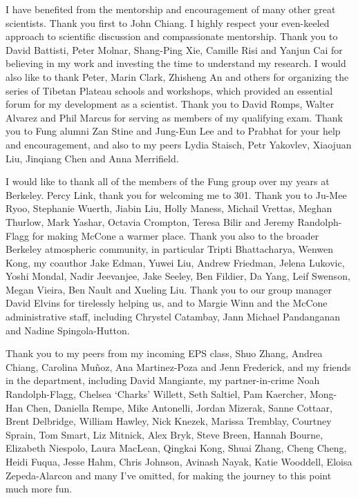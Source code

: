\documentclass{ucbthesis}
\begin{document}
\begin{frontmatter}
\begin{acknowledgements}
I have benefited from the mentorship and encouragement of many other great scientists. Thank you first to John Chiang. I highly respect your even-keeled approach to scientific discussion and compassionate mentorship. Thank you to David Battisti, Peter Molnar, Shang-Ping Xie, Camille Risi and Yanjun Cai for believing in my work and investing the time to understand my research. I would also like to thank Peter, Marin Clark, Zhisheng An and others for organizing the series of Tibetan Plateau schools and workshops, which provided an essential forum for my development as a scientist. Thank you to David Romps, Walter Alvarez and Phil Marcus for serving as members of my qualifying exam. Thank you to Fung alumni Zan Stine and Jung-Eun Lee and to Prabhat for your help and encouragement, and also to my peers Lydia Staisch, Petr Yakovlev, Xiaojuan Liu, Jinqiang Chen and Anna Merrifield.

I would like to thank all of the members of the Fung group over my years at Berkeley. Percy Link, thank you for welcoming me to 301. Thank you to Ju-Mee Ryoo, Stephanie Wuerth, Jiabin Liu, Holly Maness, Michail Vrettas, Meghan Thurlow, Mark Yashar, Octavia Crompton, Teresa Bilir and Jeremy Randolph-Flagg for making McCone a warmer place. Thank you also to the broader Berkeley atmospheric community, in particular Tripti Bhattacharya, Wenwen Kong, my coauthor Jake Edman, Yuwei Liu, Andrew Friedman, Jelena Lukovic, Yoshi Mondal, Nadir Jeevanjee, Jake Seeley, Ben Fildier, Da Yang, Leif Swenson, Megan Vieira, Ben Nault and Xueling Liu. Thank you to our group manager David Elvins for tirelessly helping us, and to Margie Winn and the McCone administrative staff, including Chrystel Catambay, Jann Michael Pandanganan and Nadine Spingola-Hutton.

Thank you to my peers from my incoming EPS class, Shuo Zhang, Andrea Chiang, Carolina Mu\~{n}oz, Ana Martinez-Poza and Jenn Frederick, and my friends in the department, including David Mangiante, my partner-in-crime Noah Randolph-Flagg, Chelsea `Charks' Willett, Seth Saltiel, Pam Kaercher, Mong-Han Chen, Daniella Rempe, Mike Antonelli, Jordan Mizerak, Sanne Cottaar, Brent Delbridge, William Hawley, Nick Knezek, Marissa Tremblay, Courtney Sprain, Tom Smart, Liz Mitnick, Alex Bryk, Steve Breen, Hannah Bourne, Elizabeth Niespolo, Laura MacLean, Qingkai Kong, Shuai Zhang, Cheng Cheng, Heidi Fuqua, Jesse Hahm, Chris Johnson, Avinash Nayak, Katie Wooddell, Eloisa Zepeda-Alarcon and many I've omitted, for making the journey to this point much more fun. 


\end{acknowledgements}
\end{frontmatter}
\end{document}
